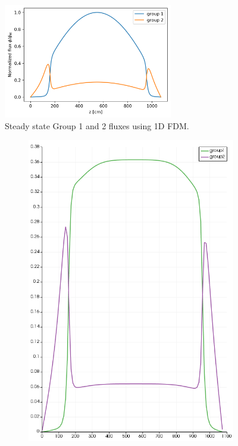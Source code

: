 \documentclass[11pt,letterpaper]{article}
\begin{document}
	\begin{figure}[htbp!]
		\centering
		\includegraphics[height=5cm]{1D-fuel-reflec-eig-FDM}
		\caption{Steady state Group 1 and 2 fluxes using 1D FDM.}
		\label{fig:1D-fuel-reflec-eig1}
	\end{figure}

	\begin{figure}[htbp!]
		\centering
		\begin{subfigure}[t]{0.4\textwidth}
			\centering
			\includegraphics[width=\linewidth]{1D-fuel-reflec-eig1B}

\end{subfigure}
\end{figure}
\end{document}
